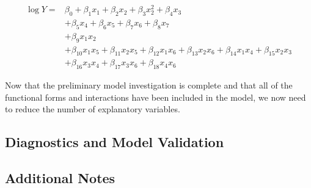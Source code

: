 \documentclass{article}
\begin{document}
      \begin{align*}
        \log{Y} = &\beta_0 + \beta_1 x_1 + \beta_2 x_2 + \beta_3 x_2^2 + \beta_4 x_3 \\
                    &+ \beta_5 x_4 + \beta_6 x_5 + \beta_7 x_6 + \beta_8 x_7 \\
                    &+ \beta_9 x_1 x_2 \\
                    &+ \beta_{10} x_1 x_5 + \beta_{11} x_2 x_5 + \beta_{12} x_1 x_6 + \beta_{13} x_2 x_6 + \beta_{14} x_1 x_4 + \beta_{15} x_2 x_3 \\
                    &+ \beta_{16} x_3 x_4 + \beta_{17} x_3 x_6 + \beta_{18} x_4 x_6
      \end{align*}

      Now that the preliminary model investigation is complete and that all of the
      functional forms and interactions have been included in the model, we now
      need to reduce the number of explanatory variables.

    \subsection{Diagnostics and Model Validation}

    \subsection{Additional Notes}
\end{document}
